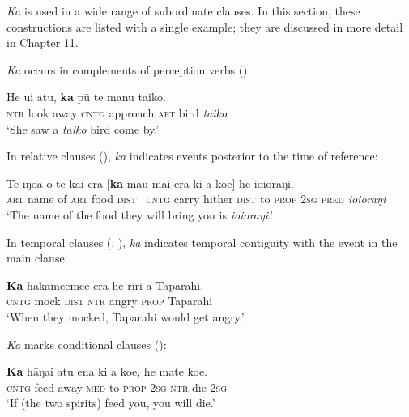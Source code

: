 \textit{Ka} is used in a wide range of subordinate clauses. In this section, these constructions are listed with a single example; they are discussed in more detail in Chapter 11. 

\textit{Ka} occurs in complements of perception verbs ():

\ea\label{ex:7.42}
\gll He u{\ꞌ}i atu, \textbf{ka} pū te manu taiko. \\
\textsc{ntr} look away \textsc{cntg} approach \textsc{art} bird \textit{taiko} \\

\glt
‘She saw a \textit{taiko} bird come by.’ \textstyleExampleref{[Ley-9-55.078]}
\z

In relative clauses (), \textit{ka} indicates events posterior to the time of reference:

\ea\label{ex:7.43}
\gll Te {\ꞌ}īŋoa o te kai era [\textbf{ka} ma{\ꞌ}u mai era ki a koe] he ioioraŋi. \\
\textsc{art} name of \textsc{art} food \textsc{dist} ~\textsc{cntg} carry hither \textsc{dist} to \textsc{prop} \textsc{2sg} \textsc{pred} \textit{ioioraŋi} \\

\glt
‘The name of the food they will bring you is \textit{ioioraŋi}.’ \textstyleExampleref{[R310.060]} 
\z

In temporal clauses (, ), \textit{ka} indicates temporal contiguity with the event in the main clause:

\ea\label{ex:7.44}
\gll \textbf{Ka} hakame{\ꞌ}eme{\ꞌ}e era he riri a Taparahi. \\
\textsc{cntg} mock \textsc{dist} \textsc{ntr} angry \textsc{prop} Taparahi \\

\glt
‘When they mocked, Taparahi would get angry.’ \textstyleExampleref{[R250.151]} 
\z

\textit{Ka} marks conditional clauses ():

\ea\label{ex:7.45}
\gll \textbf{Ka} hāŋai atu ena ki a koe, he mate koe. \\
\textsc{cntg} feed away \textsc{med} to \textsc{prop} \textsc{2sg} \textsc{ntr} die \textsc{2sg} \\

\glt
‘If (the two spirits) feed you, you will die.’ \textstyleExampleref{[R310.061]} 
\z

